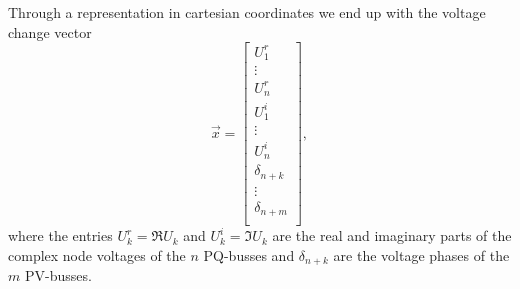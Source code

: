 Through a representation in cartesian coordinates we end up with the voltage change vector
\begin{equation}
	\vec x = 
	\begin{bmatrix}
		U_1^r \\
		\vdots \\
		U_n^r \\
		U_1^i \\
		\vdots \\
		U_n^i \\
		\delta_{n+k} \\
		\vdots \\
		\delta_{n+m} \\
	\end{bmatrix},
\end{equation}
where the entries $U_k^r = \Re{U_k}$ and $U_k^i = \Im{U_k}$ are the real and imaginary parts of the complex node voltages of the $n$ PQ-busses and $\delta_{n+k}$ are the voltage phases of the $m$ PV-busses.

